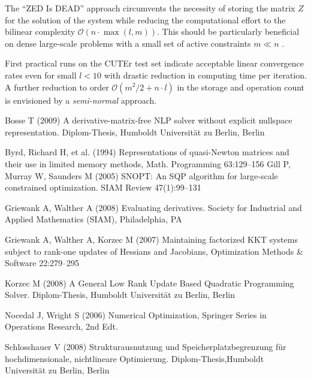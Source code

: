 \documentclass{svmult}
\begin{document}
\noindent The ``ZED Is DEAD'' approach circumvents the necessity of storing the matrix
$Z$ for the solution of the system while reducing the computational effort to the
bilinear complexity $\mathcal{O}(n\cdot \max (l,m))$. This should be particularly beneficial on dense large-scale problems
with a small set of active constraints $m \ll n$ .

\noindent First practical runs on the CUTEr test set indicate acceptable linear
convergence rates even for small $l < 10$ with drastic reduction in computing time per iteration. A further
reduction to order $\mathcal{O} (m^2/2 +n\cdot l)$ in the storage and operation count is envisioned by a \textit{semi-normal} approach.
\begin{thebibliography}{99.}
	 Bosse T (2009) A derivative-matrix-free NLP solver without explicit nullspace representation. Diplom-Thesis, Humboldt Universit\"at zu Berlin, Berlin

	 Byrd, Richard H, et al. (1994) Representations of quasi-{N}ewton matrices and their use in
				limited memory methods, Math. Programming 63:129--156
	 Gill P, Murray W, Saunders M (2005) SNOPT: An SQP algorithm for large-scale constrained optimization.
				SIAM Review 47(1):99--131

	 Griewank A, Walther A (2008) Evaluating derivatives.
				Society for Industrial and Applied Mathematics (SIAM), Philadelphia, PA

	 Griewank A, Walther A, Korzec M (2007) Maintaining factorized {KKT} systems subject to rank-one
				updates of {H}essians and {J}acobians, Optimization Methods \& Software 22:279--295

	 Korzec M (2008) A General Low Rank Update Based Quadratic Programming Solver. Diplom-Thesis, Humboldt Universit\"at zu Berlin, Berlin

     Nocedal J,  Wright S (2006) Numerical Optimization, Springer Series in Operations Research,  2nd Edt.
	
	 Schlosshauer V (2008) Strukturausnutzung und Speicherplatzbegrenzung f\"ur hochdimensionale, nichtlineare Optimierung. Diplom-Thesis,Humboldt Universit\"at zu Berlin, Berlin

\end{thebibliography}


\end{document}
